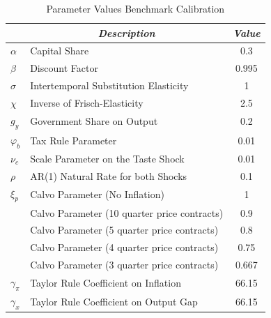 \documentclass[12pt,a4paper,oneside,titlepage]{article}
\begin{document}
\begin{table}[th]
\centering
\caption{Parameter Values Benchmark Calibration}
\bigskip
\bgroup
\def\arraystretch{1.5}
\begin{tabular}{p{1.2cm} l c}
\toprule\toprule \noalign{\smallskip}
 & \multicolumn{1}{c}{\textit{Description}} & \textit{Value} \\
\hline\noalign{\smallskip}

$\alpha$ & Capital Share   & 0.3 \\
$\beta$  & Discount Factor & 0.995 \\
$\sigma$ & Intertemporal Substitution Elasticity & 1 \\
$\chi$ & Inverse of Frisch-Elasticity & 2.5 \\
$g_y$ & Government Share on Output & 0.2 \\
$\varphi_b$ & Tax Rule Parameter & 0.01 \\
$\nu_c$ & Scale Parameter on the Taste Shock & 0.01 \\
$\rho$ & AR(1) Natural Rate for both Shocks & 0.1 \\
$\xi_p$ & Calvo Parameter (No Inflation) & 1 \\
 & Calvo Parameter (10 quarter price contracts) & 0.9 \\
 & Calvo Parameter (5  quarter price contracts) & 0.8 \\
 & Calvo Parameter (4  quarter price contracts) & 0.75 \\
 & Calvo Parameter (3  quarter price contracts) & 0.667 \\
$\gamma_{\pi}$ & Taylor Rule Coefficient on Inflation & 66.15 \\
$\gamma_x$ & Taylor Rule Coefficient on Output Gap & 66.15 \\
\bottomrule
\end{tabular}
\egroup
\label{tab:Tabel1}
\end{table}
\end{document}
